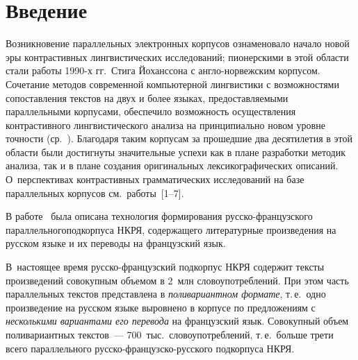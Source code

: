 
\vspace*{-12pt}



\thispagestyle{headings}

\begin{multicols}{2}

\label{st\stat}

\section{Введение} %

\vspace*{-3pt}

  Возникновение параллельных электронных корпусов ознаменовало начало
новой эры контрастивных лингвистических исследований; пионерскими в этой
области стали работы 1990-х гг.\ Стига Йоханссона с анг\-ло-нор\-веж\-ским
корпусом. Сочетание методов современной компьютерной лингвистики с
возможностями сопоставления текстов на двух и более языках,
предоставляемыми параллельными корпусами, обеспечило возможность
осуществления контрастивного лингвистического анализа на принципиально
новом уровне точности (ср.~\cite{zat-1}). Благодаря таким корпусам за
прошедшие два десятилетия в этой области были достигнуты значительные
успехи как в плане разработки методик анализа, так и в плане создания
оригинальных лексикографических описаний. О~перспективах контрастивных
грамматических исследований на базе параллельных корпусов см.\
работы~[1--7].
\columnbreak

  В работе~\cite{zat-8} была описана технология фор\-ми\-рования
  русско-французского параллельного\linebreak подкорпуса НКРЯ, содержащего литературные произведения на русском языке и их
переводы на французский язык.

В~настоящее время рус\-ско-фран\-цуз\-ский
подкорпус НКРЯ содержит тексты произведений совокупным объемом в 2~млн
словоупотреблений. При этом часть параллельных текстов представлена в
\textit{поливариантном формате}, т.\,е.\ одно произведение на русском языке
выровнено в корпусе по предложениям с \textit{несколькими вариантами его
перевода} на французский язык. Совокупный объем поливариантных
текстов~--- 700~тыс.\ словоупотреблений, т.\,е.\ больше трети всего
параллельного рус\-ско-фран\-цуз\-ско-рус\-ско\-го подкорпуса НКРЯ.


\end{multicols}
